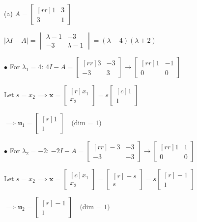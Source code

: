 \documentclass{article}
\begin{document}
    \begin{minipage}{0.48\linewidth}
    (a) $A = \begin{bmatrix}[rr]
        1 & 3 \\
        3 & 1
    \end{bmatrix} $
   
    $            | \lambda I - A| = \begin{vmatrix}
                \lambda  - 1 & -3 \\
                -3 & \lambda  - 1
            \end{vmatrix} = ( \lambda  - 4 )( \lambda  + 2 )$
    
    $\bullet$ For $ \lambda _1 = 4$: $ 4I - A = \begin{bmatrix}[rr]
        3 & -3 \\
        -3 & 3
    \end{bmatrix} \rightarrow \begin{bmatrix}[rr]
        1 & -1 \\
        0 & 0 
    \end{bmatrix} $

    Let $s = x_2 \implies \textbf{x} = \begin{bmatrix}[r]
        x_1 \\
        x_2
    \end{bmatrix} = s \begin{bmatrix}[c]
        1 \\ 1
    \end{bmatrix}$

    $\implies \textbf{u}_1 = \begin{bmatrix}[r]
        1 \\
        1 
    \end{bmatrix} \quad \text{(dim = 1)}$


    $\bullet$ For $ \lambda _2 = -2$: $-2I - A = \begin{bmatrix}[rr]
        -3 & -3 \\
        -3 & -3 
    \end{bmatrix} \to \begin{bmatrix}[rr]
        1 & 1 \\
        0 & 0 
    \end{bmatrix} $

    Let $s = x_2 \implies \textbf{x} = \begin{bmatrix}[c]
        x_1 \\ x_2 
    \end{bmatrix} = \begin{bmatrix}[r]
        -s \\ s 
    \end{bmatrix} = s \begin{bmatrix}[r]
        -1 \\ 1 
    \end{bmatrix} $

    $\implies \textbf{u}_2 = \begin{bmatrix}[r]
        -1 \\
        1 
    \end{bmatrix} \quad \text{(dim = 1)}$

    \end{minipage} \hfill
\end{document}
